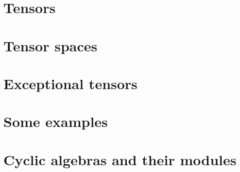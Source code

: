 \documentclass{documentation}
\begin{document}
\chapter{Tensors}\label{ch:tensors}




\chapter{Tensor spaces}\label{ch:tensor-spaces}



\chapter{Exceptional tensors}\label{ch:exceptional}



\chapter{Some examples}\label{ch:examples}



\appendix

\chapter{Cyclic algebras and their modules}\label{append:cyclic}



\backmatter
\end{document}
